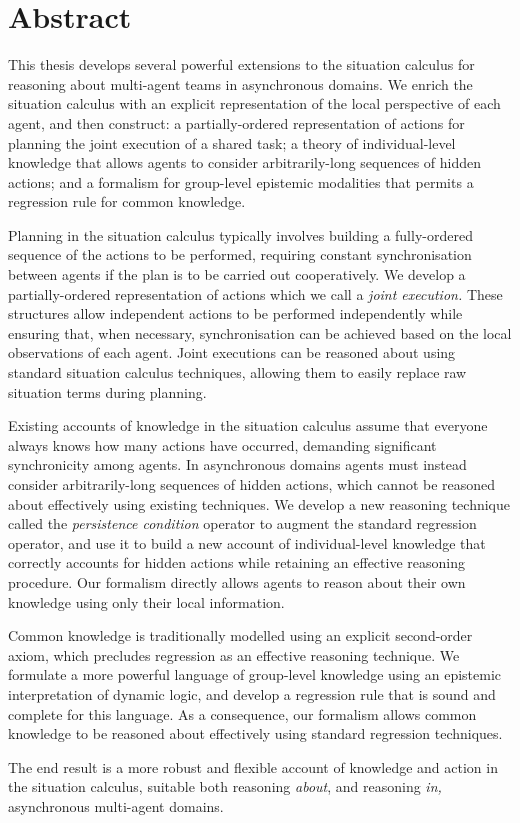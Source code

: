 

\chapter*{Abstract}

This thesis develops several powerful extensions to the situation
calculus for reasoning about multi-agent teams in asynchronous domains.
We enrich the situation calculus with an explicit representation of
the local perspective of each agent, and then construct: a partially-ordered
representation of actions for planning the joint execution of a shared
task; a theory of individual-level knowledge that allows agents to
consider arbitrarily-long sequences of hidden actions; and a formalism
for group-level epistemic modalities that permits a regression rule
for common knowledge.

Planning in the situation calculus typically involves building
a fully-ordered sequence of the actions to be performed, requiring
constant synchronisation between agents if the plan is to be carried
out cooperatively. We develop a partially-ordered representation of
actions which we call a \emph{joint execution.} These structures allow
independent actions to be performed independently while ensuring that,
when necessary, synchronisation can be achieved based on the local
observations of each agent. Joint executions can be reasoned about
using standard situation calculus techniques, allowing them to easily
replace raw situation terms during planning.

Existing accounts of knowledge in the situation calculus assume that
everyone always knows how many actions have occurred, demanding significant
synchronicity among agents. In asynchronous domains agents must instead
consider arbitrarily-long sequences of hidden actions, which cannot
be reasoned about effectively using existing techniques. We develop
a new reasoning technique called the \emph{persistence condition}
operator to augment the standard regression operator, and use it to
build a new account of individual-level knowledge that correctly accounts
for hidden actions while retaining an effective reasoning procedure.
Our formalism directly allows agents to reason about their own knowledge
using only their local information.

Common knowledge is traditionally modelled using an explicit second-order
axiom, which precludes regression as an effective reasoning technique.
We formulate a more powerful language of group-level knowledge using
an epistemic interpretation of dynamic logic, and develop a regression
rule that is sound and complete for this language. As a consequence,
our formalism allows common knowledge to be reasoned about effectively
using standard regression techniques.

The end result is a more robust and flexible account of knowledge
and action in the situation calculus, suitable both reasoning \emph{about},
and reasoning \emph{in,} asynchronous multi-agent domains.

